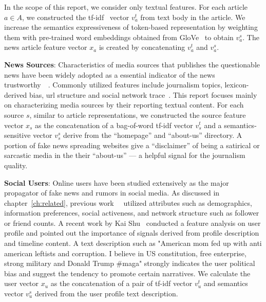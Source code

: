 \documentclass[fyp]{socreport}
\theoremstyle{definition}
\theoremstyle{hypothesis}
\begin{document}
In the scope of this report, we consider only textual features. For each article $a\in A$, we constructed the tf-idf~\cite{sparck2004idf} vector $v^t_a$ from text body in the article. We increase the semantics expressiveness of token-based representation by weighting them with pre-trained word embeddings obtained from GloVe~\cite{pennington2014glove} to obtain $v^s_a$. The news article feature vector $x_a$ is created by concatenating $v^t_a$ and $v^s_a$.

\textbf{News Sources}: Characteristics of media sources that publishes the questionable news have been widely adopted as a essential indicator of the news trustworthy~\cite{baly2018predicting}~\cite{kulkarni2018multi}. Commonly utilized features include journalism topics, lexicon-derived bias, url structure and social network trace~\cite{baly2018predicting}. This report focuses mainly on characterizing media sources by their reporting textual content. For each source $s$, similar to article representations, we constructed the source feature vector $x_s$ 
as the concatenation of a bag-of-word tf-idf vector $v^t_s$ and a semantics-sensitive vector $v^s_s$ derive from the ``homepage'' and ``about-us'' directory. A portion of fake news spreading websites give a ``disclaimer'' of being a satirical or sarcastic media in the their ``about-us'' --- a helpful signal for the journalism quality. 

\textbf{Social Users}: Online users have been studied extensively as the major propagator of fake news and rumors in social media. As discussed in chapter~\ref{ch:related}, previous work~\cite{castillo2011information}~\cite{yang2012automatic} utilized attributes  such  as  demographics,  information  preferences,  social activeness, and network structure such as follower or friend counts. A recent work by Kai Shu~\cite{shu2019role} conducted a feature analysis on user profile and pointed out the importance of signals derived from profile description and timeline content. A text description such as "American mom fed up with anti american leftists and corruption. I believe in US constitution, free enterprise, strong military and Donald Trump \#maga" strongly indicates the user political bias and suggest the tendency to promote certain narratives. We calculate the user vector $x_u$ as the concatenation of a pair of tf-idf vector $v^t_u$ and semantics vector $v^s_u$ derived from the user profile text description.
\end{document}
